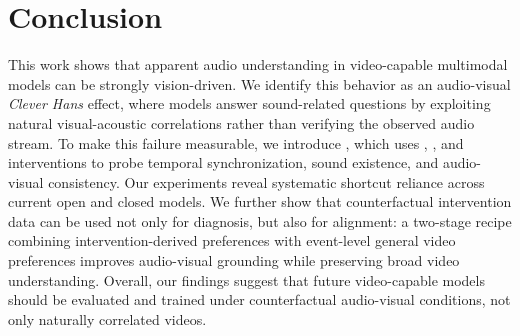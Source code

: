 \vspace{-0.5em}
\section{Conclusion}

This work shows that apparent audio understanding in video-capable multimodal models can be strongly vision-driven. We identify this behavior as an audio-visual \textit{Clever Hans} effect, where models answer sound-related questions by exploiting natural visual-acoustic correlations rather than verifying the observed audio stream. To make this failure measurable, we introduce \Thud, which uses \shift, \mute, and \swap interventions to probe temporal synchronization, sound existence, and audio-visual consistency. Our experiments reveal systematic shortcut reliance across current open and closed models. We further show that counterfactual intervention data can be used not only for diagnosis, but also for alignment: a two-stage recipe combining intervention-derived preferences with event-level general video preferences improves audio-visual grounding while preserving broad video understanding. Overall, our findings suggest that future video-capable models should be evaluated and trained under counterfactual audio-visual conditions, not only naturally correlated videos.